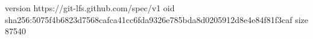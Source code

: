 version https://git-lfs.github.com/spec/v1
oid sha256:5075f4b6823d7568cafca41cc6fda9326e785bda8d0205912d8e4e84f81f3caf
size 87540
